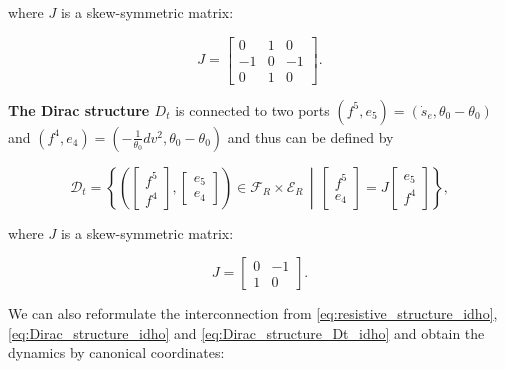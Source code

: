 \documentclass[
	parskip, 			   %
	twoside, 			   %
	DIV=14, 			   %
	BCOR=15.0mm, 		   %
	headsepline, 		   %
	open=right, 		   %
	captions=tableheading, %
	bibliography=totoc,    %
	numbers=noenddot       %
]{scrreprt}
\begin{document}
where $J$ is a skew-symmetric matrix:

\begin{equation}
    \label{eq:skew-symmetric_matrix_idho}
    J = 
    \left[\begin{array}{rr|r}
    0 & 1 & 0 \\
    -1 & 0 & -1 \\
    \hline 0 & 1 & 0
    \end{array}\right].
\end{equation}

\textbf{The Dirac structure $D_t$} is connected to two ports $(f^5, e_5) = (\dot{s}_e, \theta_{0}-\theta_{0})$ and $(f^4, e_4) = (-\frac{1}{\theta_{0}}dv^2, \theta_{0}-\theta_{0})$ and thus can be defined by

\begin{equation}
    \label{eq:Dirac_structure_Dt_idho}
    \mathcal{D}_t=\left\{ \left( \left[\begin{array}{l}f^5 \\ \hline f^4 \end{array} \right], \left[\begin{array}{l} e_5 \\ \hline e_4 \end{array}\right] \right) \in \mathcal{F}_R \times \mathcal{E}_R   \,\middle\vert\,    \left[\begin{array}{l}f^5 \\ \hline e_4\end{array}\right]=J\left[\begin{array}{l}e_5 \\ \hline f^4 \end{array}\right]\right\},
\end{equation}

where $J$ is a skew-symmetric matrix:

\begin{equation}
    \label{eq:skew-symmetric_matrix_Dt_idho}
    J = 
    \left[\begin{array}{r|r}
    0 & -1 \\
    \hline 1 & 0
    \end{array}\right].
\end{equation}


We can also reformulate the interconnection from \ref{eq:resistive_structure_idho}, \ref{eq:Dirac_structure_idho} and \ref{eq:Dirac_structure_Dt_idho} and obtain the dynamics by canonical coordinates:
\end{document}
